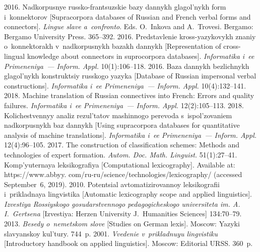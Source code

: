 \begin{multicols}{2}
{{\begin{thebibliography}{99}
 2016. Nadkorpusnye russko-frantsuzskie bazy 
dannykh glagol'nykh form i~konnektorov [Supracorpora databases of Russian and French verbal 
forms and connectors]. \textit{Lingue slave a~confronto}. Eds. 
O.~Inkova and A.~Trovesi. Bergamo: Bergamo University Press. 365--392.
 2016. 
Predstavlenie kross-yazykovykh znaniy o~konnektorakh v~nadkorpusnykh bazakh dannykh 
[Representation of cross-lingual knowledge about connectors in suprocorpora databases]. 
\textit{Informatika i~ee Primeneniya~--- Inform. Appl.} 10(1):106--118.
 2016. Baza dannykh bezlichnykh 
glagol'nykh konstruktsiy russkogo yazyka [Database of Russian impersonal verbal 
constructions]. \textit{Informatika i~ee Primeneniya~--- Inform. Appl.} 10(4):132--141.
 2018. Machine translation of Russian 
connectives into French: Errors and quality failures. \textit{Informatika i~ee Primeneniya~--- 
Inform. Appl.} 12(2):105--113.
 2018. 
Kolichestvennyy analiz rezul'tatov mashinnogo perevoda s~ispol'zovaniem nadkorpusnykh baz 
dannykh [Using supracorpora databases for quantitative analysis of machine translations]. 
\textit{Informatika i~ee Primeneniya~--- Inform. Appl.} 12(4):96--105.
 2017. The construction of 
classification schemes: Methods and technologies of expert formation. \textit{Autom. Doc. Math. 
Linguist.} 51(1):27--41.
 Komp'yuternaya leksikografiya [Computational lexicography]. Available 
at: {\sf https://www.abbyy. com/ru-ru/science/technologies/lexicography/} (accessed 
September~6, 2019).
 2010. Potentsial avtomatizirovannoy leksikografii i~prikladnaya 
lingvistika  [Automatic lexicography scope and applied linguistics]. \textit{Izvestiya 
Rossiyskogo gosudarstvennogo pedagogicheskogo universiteta im. A.\,I.~Gertsena} 
[Izvestiya: 
Herzen University J.~Humanities Sciences] 134:70--79.
 2013. \textit{Besedy o~nemetskom slove} [Studies on German 
lexis]. Moscow: Yazyki slavyanskoy kul'tury. 744~p.
 2001. \textit{Vvedenie v~prikladnuyu lingvistiku} 
[Introductory handbook on applied linguistics]. Moscow: Editorial URSS. 360~p.
\end{thebibliography}

 }
 }

\end{multicols}

